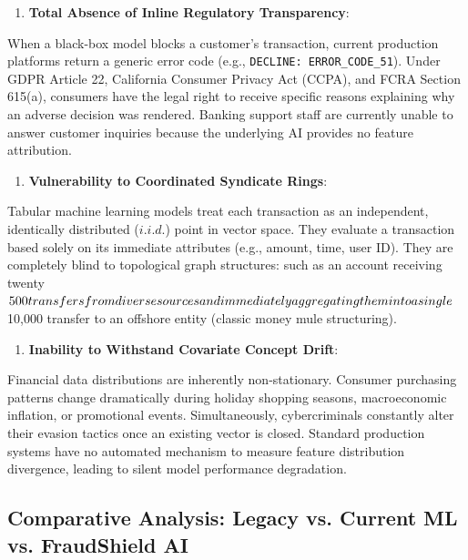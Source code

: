 \documentclass[12pt,a4paper,oneside]{report}
\begin{document}
\begin{enumerate}[leftmargin=0.35in]
\item \textbf{Total Absence of Inline Regulatory Transparency}:
\end{enumerate}
When a black-box model blocks a customer's transaction, current production platforms return a generic error code (e.g., \texttt{DECLINE: ERROR\_CODE\_51}). Under GDPR Article 22, California Consumer Privacy Act (CCPA), and FCRA Section 615(a), consumers have the legal right to receive specific reasons explaining why an adverse decision was rendered. Banking support staff are currently unable to answer customer inquiries because the underlying AI provides no feature attribution.


\begin{enumerate}[leftmargin=0.35in]
\item \textbf{Vulnerability to Coordinated Syndicate Rings}:
\end{enumerate}
Tabular machine learning models treat each transaction as an independent, identically distributed ($i.i.d.$) point in vector space. They evaluate a transaction based solely on its immediate attributes (e.g., amount, time, user ID). They are completely blind to topological graph structures: such as an account receiving twenty \\$500 transfers from diverse sources and immediately aggregating them into a single \\$10,000 transfer to an offshore entity (classic money mule structuring).


\begin{enumerate}[leftmargin=0.35in]
\item \textbf{Inability to Withstand Covariate Concept Drift}:
\end{enumerate}
Financial data distributions are inherently non-stationary. Consumer purchasing patterns change dramatically during holiday shopping seasons, macroeconomic inflation, or promotional events. Simultaneously, cybercriminals constantly alter their evasion tactics once an existing vector is closed. Standard production systems have no automated mechanism to measure feature distribution divergence, leading to silent model performance degradation.



\subsection{Comparative Analysis: Legacy vs. Current ML vs. FraudShield AI}
\end{document}
